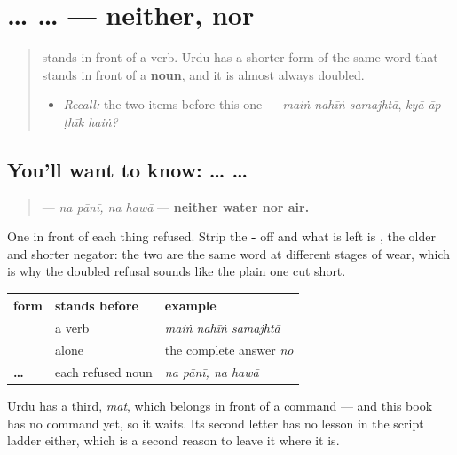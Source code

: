 \section[\texorpdfstring{\ur{نہ} … \ur{نہ} … (na … na …)}{نہ … نہ … (na … na …)}]{ …  … — neither, nor}

\label{lesson:UR-C19-na-na}



\begin{quote}
\textbf{} stands in front of a verb. Urdu has a shorter form of the same word that stands in front of a \textbf{noun}, and it is almost always doubled.

\begin{itemize}
\raggedright
  \item \emph{Recall:} the two items before this one — \emph{maiṅ nahīṅ samajhtā}, \emph{kyā āp ṭhīk haiṅ?}
\end{itemize}
\end{quote}

\subsection*{You'll want to know:  …  …}
\begin{quote}
\textbf{   } — \emph{na pānī, na hawā} — \textbf{neither water nor air.}
\end{quote}

One \textbf{} in front of each thing refused. Strip the \textbf{-} off \textbf{} and what is left is \textbf{}, the older and shorter negator: the two are the same word at different stages of wear, which is why the doubled refusal sounds like the plain one cut short.

\begin{grammarlens}[title={Grammar Lens: three negators, told apart by what follows them}]
\noindent
\begin{tabularx}{\linewidth}{@{}>{\raggedright\arraybackslash}X>{\raggedright\arraybackslash}X>{\raggedright\arraybackslash}X@{}}
\toprule
\textbf{form} & \textbf{stands before} & \textbf{example} \\
\midrule
\textbf{\ur{نہیں}} & a verb & \emph{maiṅ nahīṅ samajhtā} \\
\textbf{\ur{نہیں}} & alone & the complete answer \emph{no} \\
\textbf{\ur{نہ} … \ur{نہ}} & each refused noun & \emph{na pānī, na hawā} \\
\bottomrule
\end{tabularx}

Urdu has a third, \emph{mat}, which belongs in front of a command — and this book has no command yet, so it waits. Its second letter has no lesson in the script ladder either, which is a second reason to leave it where it is.
\end{grammarlens}

